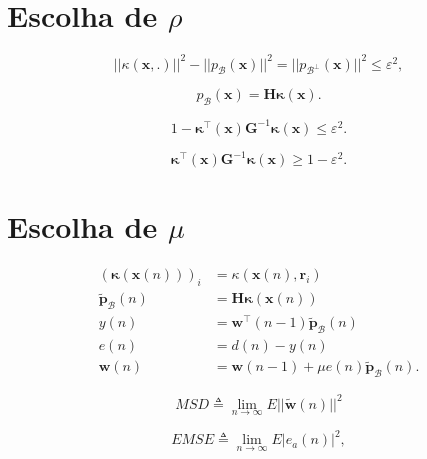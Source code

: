 \section{Escolha de $\rho$}

\begin{equation}
    ||\kappa(\mathbf{x},.)||^2 - ||p_{\mathcal{B}}(\mathbf{x})||^2 = ||p_{\mathcal{B}^\perp}(\mathbf{x})||^2 \leq \varepsilon^2,
\end{equation}

\begin{equation}
    p_{\mathcal{B}}(\mathbf{x}) = \mathbf{H}\boldsymbol{\kappa}(\mathbf{x}).
\end{equation}

\begin{equation}
    1 - \boldsymbol{\kappa}^{\top}(\mathbf{x})\mathbf{G}^{-1}\boldsymbol{\kappa}(\mathbf{x}) \leq \varepsilon^2.
\end{equation}

\begin{equation}
    \boldsymbol{\kappa}^{\top}(\mathbf{x})\mathbf{G}^{-1}\boldsymbol{\kappa}(\mathbf{x}) \geq 1 - \varepsilon^2.
\end{equation}

\section{Escolha de $\mu$}

\begin{align}
    (\boldsymbol{\kappa}(\mathbf{x}(n)))_i &= \kappa(\mathbf{x}(n),\mathbf{r}_i)\\
    \tilde{\mathbf{p}}_{\mathcal{B}}(n) &= \mathbf{H}\boldsymbol{\kappa}(\mathbf{x}(n))\\
    y(n) &= \mathbf{w}^\top(n-1) \tilde{\mathbf{p}}_{\mathcal{B}}(n)\\
    e(n) &= d(n) - y(n)\\
    \mathbf{w}(n) &= \mathbf{w}(n-1) + \mu e(n) \tilde{\mathbf{p}}_{\mathcal{B}}(n).\label{eq:w_adapt}
\end{align}

\begin{equation}
    MSD \triangleq \lim_{n\rightarrow \infty} E || \tilde{\mathbf{w}}(n) ||^2
\end{equation}

\begin{equation}
    EMSE \triangleq \lim_{n\rightarrow \infty} E | e_a(n) |^2, 
\end{equation}

